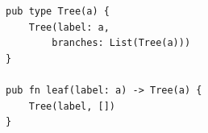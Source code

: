 \begin{lstlisting}
pub type Tree(a) {
    Tree(label: a,
        branches: List(Tree(a)))
}

pub fn leaf(label: a) -> Tree(a) {
    Tree(label, [])
}
\end{lstlisting}